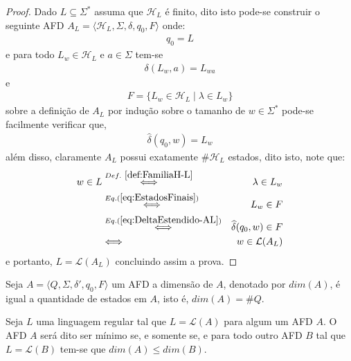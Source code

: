 \begin{proof}
	Dado $L \subseteq \Sigma^*$ assuma que $\mathcal{H}_L$ é finito, dito isto pode-se construir o seguinte AFD $A_L = \langle \mathcal{H}_L, \Sigma, \delta, q_0, F \rangle$ onde:
	\begin{eqnarray}\label{eq:EstadoInicial}
		q_0 = L
	\end{eqnarray}
	e para todo $L_w \in \mathcal{H}_L$ e $a \in \Sigma$ tem-se
	\begin{eqnarray}\label{eq:Delta-AL}
		\delta(L_w, a) = L_{wa}
	\end{eqnarray}
	e
	\begin{eqnarray}\label{eq:EstadosFinais}
		F = \{L_w \in \mathcal{H}_L \mid \lambda \in L_w\}
	\end{eqnarray}
	sobre a definição de $A_L$ por indução sobre o tamanho de $w \in \Sigma^*$ pode-se facilmente verificar que, 
	\begin{eqnarray}\label{eq:DeltaEstendido-AL}
		\widehat{\delta}(q_0, w) = L_w
	\end{eqnarray}
	além disso, claramente $A_L$ possui exatamente $\#\mathcal{H}_L$ estados, dito isto, note que:
	\begin{eqnarray*}
		w \in L & \stackrel{Def. \ \ref{def:FamiliaH-L}}{\Longleftrightarrow} & \lambda \in L_w\\
		& \stackrel{Eq. (\ref{eq:EstadosFinais})}{\Longleftrightarrow} & L_w \in F\\
		& \stackrel{Eq. (\ref{eq:DeltaEstendido-AL})}{\Longleftrightarrow} & \widehat{\delta}(q_0, w) \in F\\
		& \Longleftrightarrow & w \in \mathcal{L}(A_L)
	\end{eqnarray*}
	e portanto, $L = \mathcal{L}(A_L)$ concluindo assim a prova.
\end{proof}

\begin{definition}
	Seja $A = \langle Q, \Sigma, \delta', q_0, F \rangle$ um AFD a dimensão de $A$, denotado por $dim(A)$, é igual a quantidade de estados em $A$, isto é, $dim(A) = \# Q$. 
\end{definition}

\begin{definition}
	Seja $L$ uma linguagem regular tal que $L = \mathcal{L}(A)$ para algum um AFD $A$. O AFD $A$ será dito ser mínimo se, e somente se,  e para todo outro AFD $B$ tal que $L= \mathcal{L}(B)$ tem-se que $dim(A) \leq dim(B)$. 
\end{definition}

